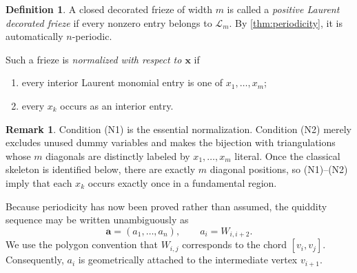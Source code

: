 \documentclass[amstex,11pt,reqno]{amsart}
\theoremstyle{definition}
\newtheorem{definition}[theorem]{Definition}
\newtheorem{remark}[theorem]{Remark}
\newcommand{\bx}{\bm{x}}
\newcommand{\ba}{\bm{a}}
\newcommand{\cL}{\mathscr L}
\begin{document}
\begin{definition}\label{def:positive-normalized}
A closed decorated frieze of width $m$ is called a \emph{positive Laurent decorated frieze} 
if every nonzero entry belongs to $\cL_m$. By \cref{thm:periodicity}, it is automatically $n$-periodic.

Such a frieze is \emph{normalized with respect to $\bx$} if
\begin{enumerate}[label=\textup{(N\arabic*)},leftmargin=2.6em]
\item every interior Laurent monomial entry is one of $x_1,\ldots,x_m$;
\item every $x_k$ occurs as an interior entry.
\end{enumerate}
\end{definition}

\begin{remark}\label{rem:dummy}
Condition (N1) is the essential normalization. Condition (N2) merely excludes unused dummy variables and makes the bijection with triangulations whose $m$ diagonals are distinctly labeled by $x_1,\ldots,x_m$ literal. Once the classical skeleton is identified below, there are exactly $m$ diagonal positions, so (N1)--(N2) imply that each $x_k$ occurs exactly once in a fundamental region.
\end{remark}

Because periodicity has now been proved rather than assumed, the quiddity sequence may be written unambiguously as
\[
 \ba=(a_1,\ldots,a_n),\qquad a_i=W_{i,i+2}.
\]
We use the polygon convention that $W_{i,j}$ corresponds to the chord $[v_i,v_j]$. Consequently, $a_i$ is geometrically attached to the intermediate vertex $v_{i+1}$.

\end{document}
